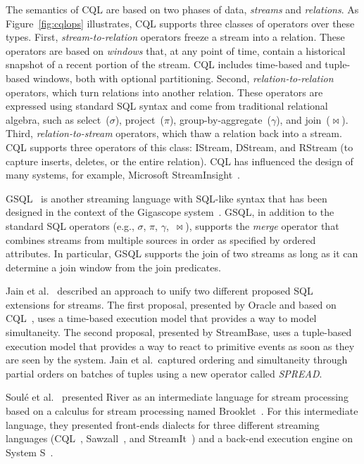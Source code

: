 The semantics of CQL are
based on two phases of data, \emph{streams} and \emph{relations}.
As Figure~\ref{fig:cqlops} illustrates, CQL
supports three classes of operators over these types. First,
\emph{stream-to-relation} operators freeze a stream into a relation.
These operators are based on
\emph{windows} that, at any point of time, contain a
historical snapshot of a recent portion of the stream. CQL includes
time-based and tuple-based windows, both with optional
partitioning. Second, \emph{relation-to-relation} operators, which
turn relations into another relation. These operators are expressed
using standard SQL syntax and come from traditional relational
algebra, such as select~($\sigma$), project~($\pi$),
group-by-aggregate~($\gamma$), and join~($\bowtie$).
Third, \emph{rela\-tion-to-stream} operators, which thaw a relation
back into a stream. CQL supports three operators of this class:
IStream, DStream, and RStream (to capture inserts, deletes, or the entire
relation).  CQL has influenced the design of many
systems, for example, Microsoft StreamInsight~\cite{ali_et_al_2009}.

GSQL~\cite{cranor_et_al_2003} is another streaming  language with SQL-like syntax that has been designed in the context of the Gigascope system~\cite{cranor2003gigascope}. 
GSQL, 
in addition to the standard SQL operators (e.g., $\sigma$, $\pi$,
$\gamma$,~$\bowtie$), supports the \emph{merge} operator that
combines streams from multiple sources in order as specified by
ordered attributes.
In particular, GSQL supports the join of two streams as long as it can determine
a join window from the join predicates. 


Jain et al.~\cite{jain_et_al_2008} described an approach to unify two
different proposed SQL extensions for streams. The first proposal,
presented by Oracle and based on CQL~\cite{arasu_babu_widom_2006},
uses a time-based execution model that provides a way to model
simultaneity. The second proposal, presented by StreamBase, uses a
tuple-based execution model that provides a way to react to primitive
events as soon as they are seen by the system. Jain et al.\ captured
ordering and simultaneity through partial orders on batches of tuples
using a new operator called \emph{SPREAD}.

Soul\'{e} et al.~\cite{soule_et_al_2016} presented River as an intermediate language for stream processing based on 
a calculus for stream processing named Brooklet~\cite{soule_et_al_2010}. For this intermediate language,
they presented front-ends dialects for three  different streaming languages (CQL~\cite{arasu_babu_widom_2006}, Sawzall~\cite{pike2005interpreting}, and StreamIt~\cite{thies_et_al_2002})  and a back-end execution engine on System S~\cite{amini2006spc}.
